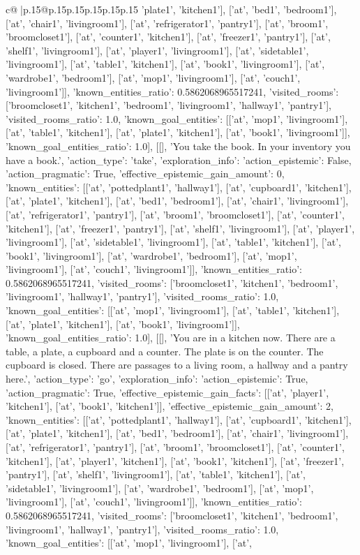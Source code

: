 \documentclass{article}
\begin{document}
{\begin{supertabular}{c@{$\;$}|p{.15\linewidth}@{}p{.15\linewidth}p{.15\linewidth}p{.15\linewidth}p{.15\linewidth}p{.15\linewidth}}
{{{'plate1', 'kitchen1'], ['at', 'bed1', 'bedroom1'], ['at', 'chair1', 'livingroom1'], ['at', 'refrigerator1', 'pantry1'], ['at', 'broom1', 'broomcloset1'], ['at', 'counter1', 'kitchen1'], ['at', 'freezer1', 'pantry1'], ['at', 'shelf1', 'livingroom1'], ['at', 'player1', 'livingroom1'], ['at', 'sidetable1', 'livingroom1'], ['at', 'table1', 'kitchen1'], ['at', 'book1', 'livingroom1'], ['at', 'wardrobe1', 'bedroom1'], ['at', 'mop1', 'livingroom1'], ['at', 'couch1', 'livingroom1']], 'known_entities_ratio': 0.5862068965517241, 'visited_rooms': ['broomcloset1', 'kitchen1', 'bedroom1', 'livingroom1', 'hallway1', 'pantry1'], 'visited_rooms_ratio': 1.0, 'known_goal_entities': [['at', 'mop1', 'livingroom1'], ['at', 'table1', 'kitchen1'], ['at', 'plate1', 'kitchen1'], ['at', 'book1', 'livingroom1']], 'known_goal_entities_ratio': 1.0}}], [[], 'You take the book. In your inventory you have a book.', {'action_type': 'take', 'exploration_info': {'action_epistemic': False, 'action_pragmatic': True, 'effective_epistemic_gain_amount': 0, 'known_entities': [['at', 'pottedplant1', 'hallway1'], ['at', 'cupboard1', 'kitchen1'], ['at', 'plate1', 'kitchen1'], ['at', 'bed1', 'bedroom1'], ['at', 'chair1', 'livingroom1'], ['at', 'refrigerator1', 'pantry1'], ['at', 'broom1', 'broomcloset1'], ['at', 'counter1', 'kitchen1'], ['at', 'freezer1', 'pantry1'], ['at', 'shelf1', 'livingroom1'], ['at', 'player1', 'livingroom1'], ['at', 'sidetable1', 'livingroom1'], ['at', 'table1', 'kitchen1'], ['at', 'book1', 'livingroom1'], ['at', 'wardrobe1', 'bedroom1'], ['at', 'mop1', 'livingroom1'], ['at', 'couch1', 'livingroom1']], 'known_entities_ratio': 0.5862068965517241, 'visited_rooms': ['broomcloset1', 'kitchen1', 'bedroom1', 'livingroom1', 'hallway1', 'pantry1'], 'visited_rooms_ratio': 1.0, 'known_goal_entities': [['at', 'mop1', 'livingroom1'], ['at', 'table1', 'kitchen1'], ['at', 'plate1', 'kitchen1'], ['at', 'book1', 'livingroom1']], 'known_goal_entities_ratio': 1.0}}], [[], 'You are in a kitchen now. There are a table, a plate, a cupboard and a counter. The plate is on the counter. The cupboard is closed. There are passages to a living room, a hallway and a pantry here.', {'action_type': 'go', 'exploration_info': {'action_epistemic': True, 'action_pragmatic': True, 'effective_epistemic_gain_facts': [['at', 'player1', 'kitchen1'], ['at', 'book1', 'kitchen1']], 'effective_epistemic_gain_amount': 2, 'known_entities': [['at', 'pottedplant1', 'hallway1'], ['at', 'cupboard1', 'kitchen1'], ['at', 'plate1', 'kitchen1'], ['at', 'bed1', 'bedroom1'], ['at', 'chair1', 'livingroom1'], ['at', 'refrigerator1', 'pantry1'], ['at', 'broom1', 'broomcloset1'], ['at', 'counter1', 'kitchen1'], ['at', 'player1', 'kitchen1'], ['at', 'book1', 'kitchen1'], ['at', 'freezer1', 'pantry1'], ['at', 'shelf1', 'livingroom1'], ['at', 'table1', 'kitchen1'], ['at', 'sidetable1', 'livingroom1'], ['at', 'wardrobe1', 'bedroom1'], ['at', 'mop1', 'livingroom1'], ['at', 'couch1', 'livingroom1']], 'known_entities_ratio': 0.5862068965517241, 'visited_rooms': ['broomcloset1', 'kitchen1', 'bedroom1', 'livingroom1', 'hallway1', 'pantry1'], 'visited_rooms_ratio': 1.0, 'known_goal_entities': [['at', 'mop1', 'livingroom1'], ['at', }}}
\end{supertabular}}
\end{document}
